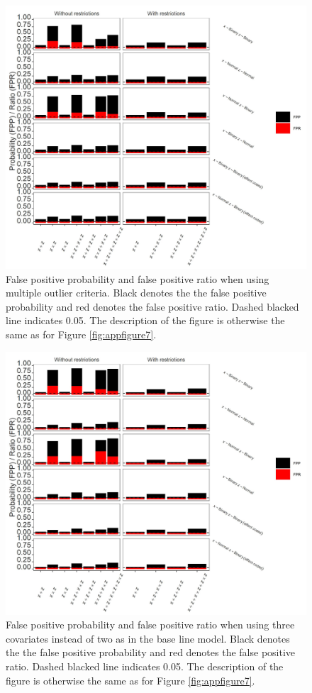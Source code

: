 \begin{figure}[hbt!]
\includegraphics[scale=0.95]{R/Analysis/Result/Figures/Figure1BSIBon.jpeg}
\centering
\caption{False positive probability and false positive ratio when using multiple outlier criteria. Black denotes the the false positive probability and red denotes the false positive ratio. Dashed blacked line indicates 0.05. The description of the figure is otherwise the same as for Figure \ref{fig:appfigure7}.
}
\label{fig:appfigure10}
\end{figure}

\begin{figure}[hbt!]
\includegraphics[scale=0.95]{R/Analysis/Result/Figures/Figure1CSIBon.jpeg}
\centering
\caption{False positive probability and false positive ratio when using three covariates instead of two as in the base line model. Black denotes the the false positive probability and red denotes the false positive ratio. Dashed blacked line indicates 0.05. The description of the figure is otherwise the same as for Figure \ref{fig:appfigure7}.
}
\label{fig:appfigure11}
\end{figure}

